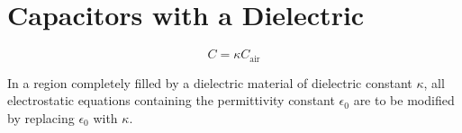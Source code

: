 \documentclass{article}
\begin{document}
    \section{Capacitors with a Dielectric}

        \begin{equation}
            C = \kappa C_\text{air}
        \end{equation}

        In a region completely filled by a dielectric material of dielectric constant $\kappa$, all electrostatic equations containing the permittivity constant $\epsilon_0$ are to be modified by replacing $\epsilon_0$ with $\kappa$.
\end{document}
